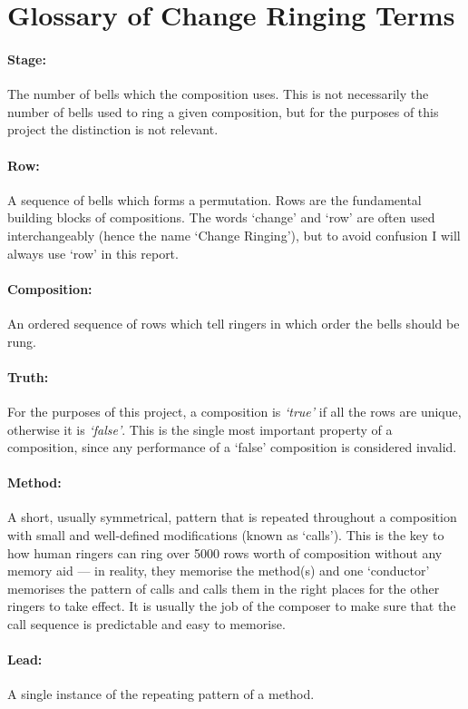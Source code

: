 \documentclass[12pt]{article}
\begin{document}
\pagebreak

\section{Glossary of Change Ringing Terms}

\paragraph{Stage:} The number of bells which the composition uses.  This is not necessarily the
number of bells used to ring a given composition, but for the purposes of this project the
distinction is not relevant.

\paragraph{Row:} A sequence of bells which forms a permutation.  Rows are the fundamental building
blocks of compositions.  The words `change' and `row' are often used interchangeably (hence the name
`Change Ringing'), but to avoid confusion I will always use `row' in this report.

\paragraph{Composition:} An ordered sequence of rows which tell ringers in which order the bells
should be rung.

\paragraph{Truth:} For the purposes of this project, a composition is \emph{`true'} if all the rows
are unique, otherwise it is \emph{`false'}.  This is the single most important property of a
composition, since any performance of a `false' composition is considered invalid.

\paragraph{Method:} A short, usually symmetrical, pattern that is repeated throughout a composition
with small and well-defined modifications (known as `calls').  This is the key to how human ringers
can ring over 5000 rows worth of composition without any memory aid --- in reality, they memorise
the method(s) and one `conductor' memorises the pattern of calls and calls them in the right places
for the other ringers to take effect.  It is usually the job of the composer to make sure that the
call sequence is predictable and easy to memorise.

\paragraph{Lead:} A single instance of the repeating pattern of a method.
\end{document}
